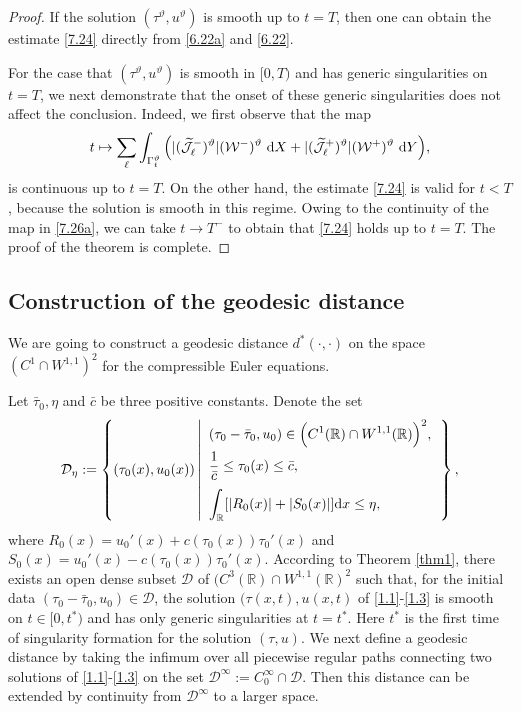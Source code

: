 \documentclass[11pt,reqno]{article}
\newcommand{\dps}{\displaystyle}
\newcommand{\fr}{\frac}
\numberwithin{equation}{section}
\begin{document}
\begin{proof}
If the solution $(\tau^\vartheta, u^\vartheta)$ is smooth up to $t=T$, then one can obtain the estimate \eqref{7.24} directly from \eqref{6.22a} and \eqref{6.22}.

For the case that $(\tau^\vartheta, u^\vartheta)$ is smooth in $[0,T)$ and has generic singularities on $t=T$, we next demonstrate that the onset of these generic singularities does not affect the conclusion. Indeed, we first observe that the map
\begin{align}\label{7.26a}
\begin{split}
t\mapsto\sum_{\ell} \int_{\Gamma_{t}^\vartheta}\Big(|(\widetilde{\mathcal{J}}_{\ell}^-)^\vartheta|(\mathcal{W}^-)^\vartheta\ {\rm d}X +|(\widetilde{\mathcal{J}}_{\ell}^+)^\vartheta|(\mathcal{W}^+)^\vartheta\ {\rm d}Y\Big),
\end{split}
\end{align}
is continuous up to $t=T$. On the other hand, the estimate \eqref{7.24} is valid for $t<T$, because the solution is smooth in this regime. Owing to the continuity of the map in \eqref{7.26a}, we can take $t\rightarrow T^-$ to obtain that \eqref{7.24} holds up to $t=T$. The proof of the theorem is complete.
\end{proof}



\subsection{Construction of the geodesic distance}\label{S73}

We are going to construct a geodesic distance $d^*(\cdot,\cdot)$ on the space $(C^1\cap W^{1,1})^2$ for the compressible Euler equations.

Let $\bar{\tau}_0, \eta$ and $\bar{c}$ be three positive constants. Denote the set
\begin{align}\label{7.26}
\mathcal{D}_{\eta}:=\left\{(\tau_0(x), u_0(x))\left|
\begin{array}{ll}
\dps (\tau_0-\bar{\tau}_0, u_0)\in \Big(C^1(\mathbb{R})\cap W^{1,1}(\mathbb{R})\Big)^2, \\[6pt]
\dps \fr{1}{\bar{c}}\leq \tau_0(x)\leq \bar{c},\\[10pt]
\dps \int_{\mathbb{R}}[|R_0(x)|+|S_0(x)|] {\rm d}x\leq \eta,
\end{array}
\right.
\right\},
\end{align}
where $R_0(x)=u_{0}'(x)+c(\tau_0(x))\tau_{0}'(x)$ and $S_0(x)=u_{0}'(x)-c(\tau_0(x))\tau_{0}'(x)$. According to Theorem \ref{thm1}, there exists an open dense subset $\mathcal{D}$ of $(C^3(\mathbb{R})\cap W^{1,1}(\mathbb{R})^2$ such that, for the initial data $(\tau_0-\bar{\tau}_0, u_0)\in \mathcal{D}$, the solution $(\tau(x,t), u(x,t)$ of \eqref{1.1}-\eqref{1.3} is smooth on $t\in[0,t^*)$ and has only generic singularities at $t=t^*$. Here $t^*$ is the first time of singularity formation for the solution $(\tau, u)$. We next define a geodesic distance by taking the infimum over all piecewise regular paths connecting two solutions of \eqref{1.1}-\eqref{1.3} on the set $\mathcal{D}^\infty:=C_{0}^\infty\cap \mathcal{D}$. Then this distance can be extended by continuity from $\mathcal{D}^\infty$ to a larger space.
\end{document}
